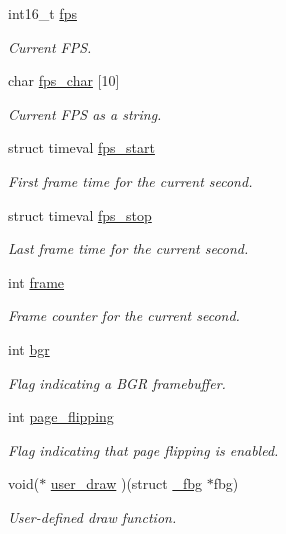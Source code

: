 \begin{DoxyCompactItemize}
int16\+\_\+t \mbox{\hyperlink{struct__fbg_a64b16363bc48d1e19141df2e242930a9}{fps}}
\begin{DoxyCompactList}\small\item\em Current F\+PS. \end{DoxyCompactList}\item 
char \mbox{\hyperlink{struct__fbg_af447e6ed58d893989c8dad075807a79b}{fps\+\_\+char}} \mbox{[}10\mbox{]}
\begin{DoxyCompactList}\small\item\em Current F\+PS as a string. \end{DoxyCompactList}\item 
struct timeval \mbox{\hyperlink{struct__fbg_a07d7bb827a7595c956fe22c2d65bba33}{fps\+\_\+start}}
\begin{DoxyCompactList}\small\item\em First frame time for the current second. \end{DoxyCompactList}\item 
struct timeval \mbox{\hyperlink{struct__fbg_ade17a45bbc82bef326857c2837cdf66c}{fps\+\_\+stop}}
\begin{DoxyCompactList}\small\item\em Last frame time for the current second. \end{DoxyCompactList}\item 
int \mbox{\hyperlink{struct__fbg_aa3ef83f919d12e680f8c64006b441454}{frame}}
\begin{DoxyCompactList}\small\item\em Frame counter for the current second. \end{DoxyCompactList}\item 
int \mbox{\hyperlink{struct__fbg_a5844c5bf4789117cbc0c972ff160b338}{bgr}}
\begin{DoxyCompactList}\small\item\em Flag indicating a B\+GR framebuffer. \end{DoxyCompactList}\item 
int \mbox{\hyperlink{struct__fbg_ad32509bca6ac4fb467476834cb8ce9d2}{page\+\_\+flipping}}
\begin{DoxyCompactList}\small\item\em Flag indicating that page flipping is enabled. \end{DoxyCompactList}\item 
void($\ast$ \mbox{\hyperlink{struct__fbg_ac66a762877982c6f381a7cfd54a8f17e}{user\+\_\+draw}} )(struct \mbox{\hyperlink{struct__fbg}{\+\_\+fbg}} $\ast$fbg)
\begin{DoxyCompactList}\small\item\em User-\/defined draw function. \end{DoxyCompactList}\item 

\end{DoxyCompactItemize}
